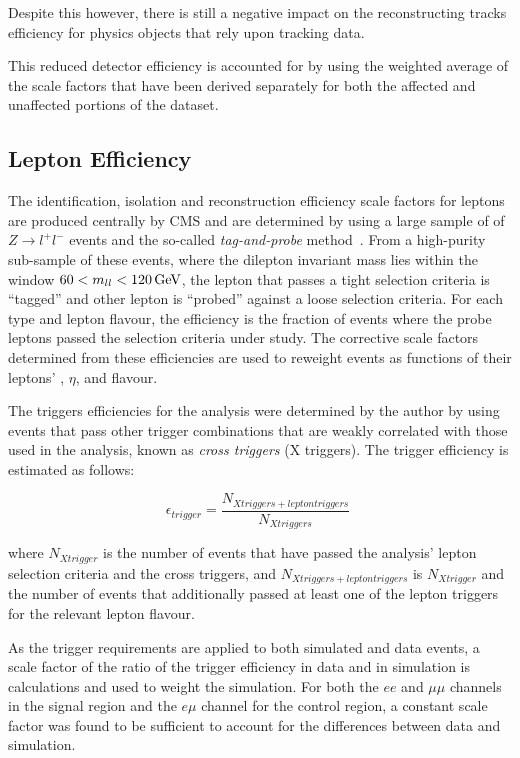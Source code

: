 Despite this however, there is still a negative impact on the reconstructing tracks efficiency for physics objects that rely upon tracking data.

This reduced detector efficiency is accounted for by using the weighted average of the scale factors that have been derived separately for both the affected and unaffected portions of the dataset.

\subsection{Lepton Efficiency}\label{subsec:leptonRecoSFs}
The identification, isolation and reconstruction efficiency scale factors for leptons are produced centrally by CMS and are determined by using a large sample of of $Z \rightarrow l^{+} l ^{-}$ events and the so-called \emph{tag-and-probe} method~\cite{CMS:2008rxa}.
From a high-purity sub-sample of these events, where the dilepton invariant mass lies within the window $60 < m_{ll} < 120 \,\text{Ge\hspace{-.08em}V}$, the lepton that passes a tight selection criteria is ``tagged'' and other lepton is ``probed'' against a loose selection criteria.
For each type and lepton flavour, the efficiency is the fraction of events where the probe leptons passed the selection criteria under study.
The corrective scale factors determined from these efficiencies are used to reweight events as functions of their leptons' \pt, $\eta$, and flavour.

The triggers efficiencies for the analysis were determined by the author by using events that pass other trigger combinations that are weakly correlated with those used in the analysis, known as \emph{cross triggers} (X triggers).
The trigger efficiency is estimated as follows:

\begin{equation}
\epsilon_{trigger} = \frac{N_{X triggers + lepton triggers}}{N_{X triggers}} \;
\end{equation}

where $N_{X trigger}$ is the number of events that have passed the analysis' lepton selection criteria and the cross triggers, and $N_{X triggers + lepton triggers}$ is $N_{X trigger}$ and the number of events that additionally passed at least one of the lepton triggers for the relevant lepton flavour.

As the trigger requirements are applied to both simulated and data events, a scale factor of the ratio of the trigger efficiency in data and in simulation is calculations and used to weight the simulation.
For both the $ee$ and $\mu\mu$ channels in the signal region and the $e \mu$ channel for the \ttbar control region, a constant scale factor was found to be sufficient to account for the differences between data and simulation.

